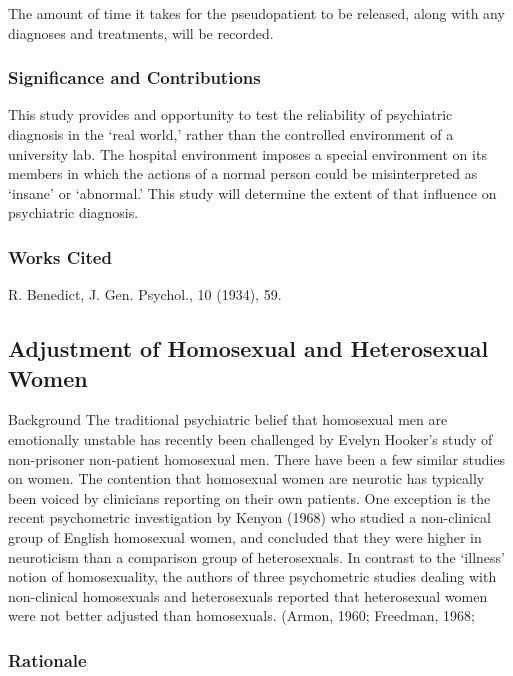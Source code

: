 \begin{refsection}
The amount of time it takes for the pseudopatient to be released, along with any diagnoses and treatments, will be recorded.

\subsubsection{Significance and Contributions}
\label{significanceandcontributions}

This study provides and opportunity to test the reliability of psychiatric diagnosis in the `real world,' rather than the controlled environment of a university lab. The hospital environment imposes a special environment on its members in which the actions of a normal person could be misinterpreted as `insane' or `abnormal.' This study will determine the extent of that influence on psychiatric diagnosis.

\subsubsection{Works Cited}
\label{workscited}

R. Benedict, J. Gen. Psychol., 10 (1934), 59.

\newpage

\subsection{Adjustment of Homosexual and Heterosexual Women}
\label{adjustmentofhomosexualandheterosexualwomen}

Background The traditional psychiatric belief that homosexual men are emotionally unstable has recently been challenged by Evelyn Hooker's study of non-prisoner non-patient homosexual men. There have been a few similar studies on women. The contention that homosexual women are neurotic has typically been voiced by clinicians reporting on their own patients. One exception is the recent psychometric investigation by Kenyon (1968) who studied a non-clinical group of English homosexual women, and concluded that they were higher in neuroticism than a comparison group of heterosexuals. In contrast to the `illness' notion of homosexuality, the authors of three psychometric studies dealing with non-clinical homosexuals and heterosexuals reported that heterosexual women were not better adjusted than homosexuals. (Armon, 1960; Freedman, 1968;

\subsubsection{Rationale}
\label{rationale}


\end{refsection}
